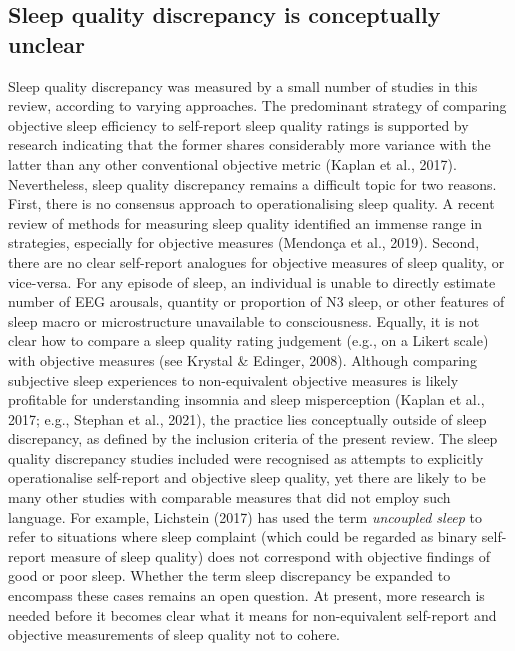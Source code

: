 \documentclass[
]{article}
\begin{document}
\subsection{Sleep quality discrepancy is conceptually unclear}\label{sleep-quality-discrepancy-is-conceptually-unclear}

Sleep quality discrepancy was measured by a small number of studies in this review, according to varying approaches. The predominant strategy of comparing objective sleep efficiency to self-report sleep quality ratings is supported by research indicating that the former shares considerably more variance with the latter than any other conventional objective metric (Kaplan et al., 2017). Nevertheless, sleep quality discrepancy remains a difficult topic for two reasons. First, there is no consensus approach to operationalising sleep quality. A recent review of methods for measuring sleep quality identified an immense range in strategies, especially for objective measures (Mendonça et al., 2019). Second, there are no clear self-report analogues for objective measures of sleep quality, or vice-versa. For any episode of sleep, an individual is unable to directly estimate number of EEG arousals, quantity or proportion of N3 sleep, or other features of sleep macro or microstructure unavailable to consciousness. Equally, it is not clear how to compare a sleep quality rating judgement (e.g., on a Likert scale) with objective measures (see Krystal \& Edinger, 2008). Although comparing subjective sleep experiences to non-equivalent objective measures is likely profitable for understanding insomnia and sleep misperception (Kaplan et al., 2017; e.g., Stephan et al., 2021), the practice lies conceptually outside of sleep discrepancy, as defined by the inclusion criteria of the present review. The sleep quality discrepancy studies included were recognised as attempts to explicitly operationalise self-report and objective sleep quality, yet there are likely to be many other studies with comparable measures that did not employ such language. For example, Lichstein (2017) has used the term \emph{uncoupled sleep} to refer to situations where sleep complaint (which could be regarded as binary self-report measure of sleep quality) does not correspond with objective findings of good or poor sleep. Whether the term sleep discrepancy be expanded to encompass these cases remains an open question. At present, more research is needed before it becomes clear what it means for non-equivalent self-report and objective measurements of sleep quality not to cohere.
\end{document}
